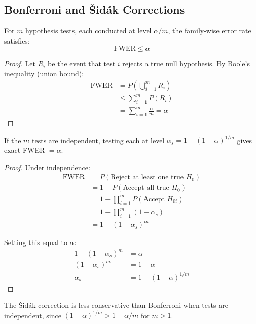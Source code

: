 \subsection{Bonferroni and Šidák Corrections}

\begin{theorem}
For $m$ hypothesis tests, each conducted at level $\alpha/m$, the family-wise error rate satisfies:
\begin{equation}
\text{FWER} \leq \alpha
\end{equation}
\end{theorem}

\begin{proof}
Let $R_i$ be the event that test $i$ rejects a true null hypothesis. By Boole's inequality (union bound):
\begin{align}
\text{FWER} &= P\left(\bigcup_{i=1}^m R_i\right) \\
&\leq \sum_{i=1}^m P(R_i) \\
&= \sum_{i=1}^m \frac{\alpha}{m} = \alpha
\end{align}
\end{proof}

\begin{theorem}
If the $m$ tests are independent, testing each at level $\alpha_s = 1 - (1-\alpha)^{1/m}$ gives exact FWER $= \alpha$.
\end{theorem}

\begin{proof}
Under independence:
\begin{align}
\text{FWER} &= P(\text{Reject at least one true } H_0) \\
&= 1 - P(\text{Accept all true } H_0) \\
&= 1 - \prod_{i=1}^m P(\text{Accept } H_{0i}) \\
&= 1 - \prod_{i=1}^m (1 - \alpha_s) \\
&= 1 - (1 - \alpha_s)^m
\end{align}

Setting this equal to $\alpha$:
\begin{align}
1 - (1-\alpha_s)^m &= \alpha \\
(1-\alpha_s)^m &= 1 - \alpha \\
\alpha_s &= 1 - (1-\alpha)^{1/m}
\end{align}
\end{proof}

\begin{remark}
The Šidák correction is less conservative than Bonferroni when tests are independent, since $(1-\alpha)^{1/m} > 1 - \alpha/m$ for $m > 1$.
\end{remark}

